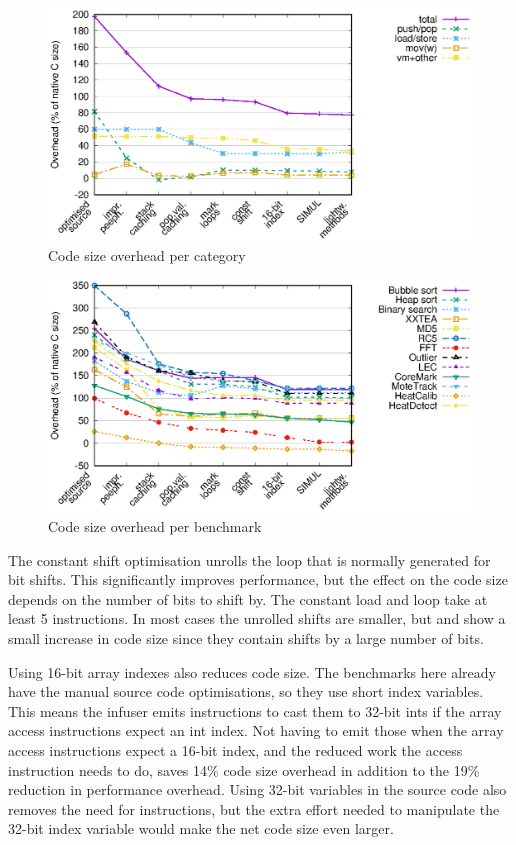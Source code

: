 \begin{figure}
\centering
\includegraphics[width=\mygraphsize]{codesizeoverhead-per-opcode-category3a.eps}
\caption{Code size overhead per category}
\label{fig-codesize-per-opcode-category}
\end{figure}

\begin{figure}
\centering
\includegraphics[width=\mygraphsize]{codesizeoverhead-per-benchmark3a.eps}
\caption{Code size overhead per benchmark}
\label{fig-codesize-per-benchmark}
\end{figure}

The constant shift optimisation unrolls the loop that is normally generated for bit shifts. This significantly improves performance, but the effect on the code size depends on the number of bits to shift by. The constant load and loop take at least 5 instructions. In most cases the unrolled shifts are smaller, but  and  show a small increase in code size since they contain shifts by a large number of bits.

Using 16-bit array indexes also reduces code size. The benchmarks here already have the manual source code optimisations, so they use short index variables. This means the infuser emits  instructions to cast them to 32-bit ints if the array access instructions expect an int index. Not having to emit those when the array access instructions expect a 16-bit index, and the reduced work the access instruction needs to do, saves 14\% code size overhead in addition to the 19\% reduction in performance overhead. Using 32-bit variables in the source code also removes the need for  instructions, but the extra effort needed to manipulate the 32-bit index variable would make the net code size even larger.

